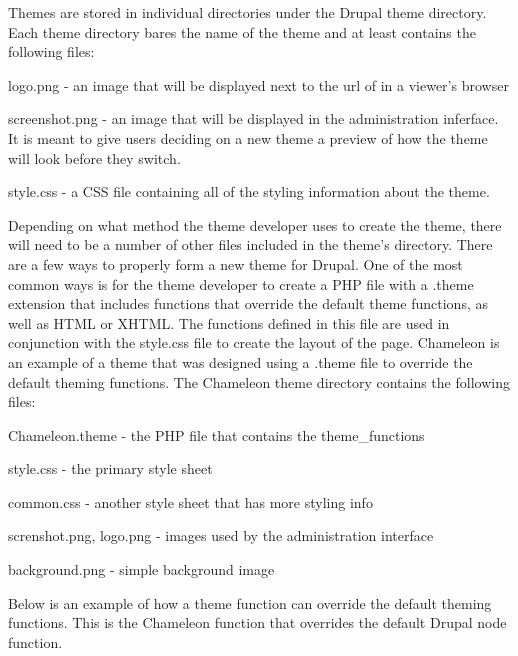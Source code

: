 \documentclass[a4paper,12pt]{report}
\begin{document}
Themes are stored in individual directories under the Drupal theme directory. 
Each theme directory bares the name of the theme and at least contains the following files:

logo.png - an image that will be displayed next to the url of in a viewer's browser

screenshot.png - an image that will be displayed in the administration inferface. 
It is meant to give users deciding on a new theme a preview of how the theme will look before they switch. 

style.css - a CSS file containing all of the styling information about the theme. 


Depending on what method the theme developer uses to create the theme, there will need to be a number of other files included in the theme's directory. 
There are a few ways to properly form a new theme for Drupal. 
One of the most common ways is for the theme developer to create a PHP file with a .theme extension that includes functions that override the default theme functions, as well as HTML or XHTML. 
The functions defined in this file are used in conjunction with the style.css file to create the layout of the page. 
Chameleon is an example of a theme that was designed using a .theme file to override the default theming functions.
The Chameleon theme directory contains the following files: 

Chameleon.theme - the PHP file that contains the theme\_functions 

style.css - the primary style sheet

common.css -  another style sheet that has more styling info

screnshot.png, logo.png - images used by the administration interface

background.png - simple background image


Below is an example of how a theme function can override the default theming functions. 
This is the Chameleon function that overrides the default Drupal node function.
\end{document}
